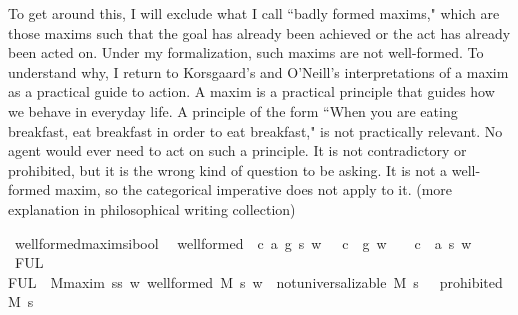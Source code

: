 \begin{isabellebody}
\begin{isamarkuptext}
To get around this, I will exclude what I call ``badly formed maxims," which are those maxims such that the goal has already been 
achieved or the act has already been acted on. Under my formalization, such maxims are 
not well-formed. To understand why, I return to Korsgaard's and O'Neill's interpretations of a maxim as a practical
guide to action. A maxim is a practical principle that guides how we behave in everyday life. A 
principle of the form ``When you are eating breakfast, eat breakfast in order to eat breakfast," is not 
practically relevant. No agent would ever need to act on such a principle. It is not contradictory
or prohibited, but it is the wrong kind of question to be asking. It is not a 
well-formed maxim, so the categorical imperative does not apply to it. (more explanation in philosophical 
writing collection)%
\end{isamarkuptext}\isamarkuptrue%
\isamarkupfalse%
\ well{\isacharunderscore}formed{\isacharcolon}{\isacharcolon}{\isachardoublequoteopen}maxim{\isasymRightarrow}s{\isasymRightarrow}i{\isasymRightarrow}bool{\isachardoublequoteclose}\ \ \isanewline
{\isachardoublequoteopen}well{\isacharunderscore}formed\ {\isasymequiv}\ {\isasymlambda}{\isacharparenleft}c{\isacharcomma}\ a{\isacharcomma}\ g{\isacharparenright}{\isachardot}\ {\isasymlambda}s{\isachardot}\ {\isasymlambda}w{\isachardot}\ {\isacharparenleft}{\isasymnot}\ \ {\isacharparenleft}c\ \isactrlbold {\isasymrightarrow}\ g{\isacharparenright}\ w{\isacharparenright}\ {\isasymand}\ {\isacharparenleft}{\isasymnot}\ \ {\isacharparenleft}c\ \isactrlbold {\isasymrightarrow}\ a\ s{\isacharparenright}\ w{\isacharparenright}{\isachardoublequoteclose}\isanewline
%
\isanewline
\isanewline
{}\isamarkupfalse%
\ FUL\ \ \isanewline
{\isachardoublequoteopen}FUL\ {\isasymequiv}\ {\isasymforall}M{\isacharcolon}{\isacharcolon}maxim{\isachardot}\ {\isasymforall}s{\isacharcolon}{\isacharcolon}s{\isachardot}\ {\isacharparenleft}{\isasymforall}w{\isachardot}\ well{\isacharunderscore}formed\ M\ s\ w{\isacharparenright}\ {\isasymlongrightarrow}\ {\isacharparenleft}not{\isacharunderscore}universalizable\ M\ s\ {\isasymlongrightarrow}\ {\isasymTurnstile}\ {\isacharparenleft}prohibited\ M\ s{\isacharparenright}\ {\isacharparenright}{\isachardoublequoteclose}\isanewline
%
\end{isabellebody}
